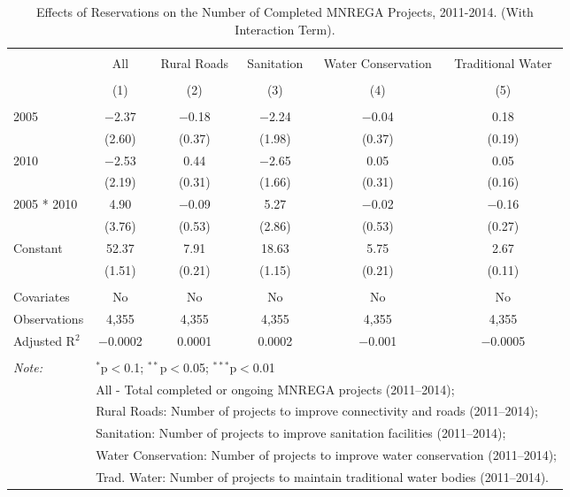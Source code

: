 
\begin{table}[!htbp] \centering 
  \caption{Effects of Reservations on the Number of Completed MNREGA Projects, 2011-2014. (With Interaction Term).} 
  \label{main_mnrega_interaction} 
\scriptsize 
\begin{tabular}{@{\extracolsep{0pt}}lccccc} 
\\[-1.8ex]\hline 
\hline \\[-1.8ex] 
 & All & Rural Roads & Sanitation & Water Conservation & Traditional Water \\ 
\\[-1.8ex] & (1) & (2) & (3) & (4) & (5)\\ 
\hline \\[-1.8ex] 
 2005 & $-$2.37 & $-$0.18 & $-$2.24 & $-$0.04 & 0.18 \\ 
  & (2.60) & (0.37) & (1.98) & (0.37) & (0.19) \\ 
  2010 & $-$2.53 & 0.44 & $-$2.65 & 0.05 & 0.05 \\ 
  & (2.19) & (0.31) & (1.66) & (0.31) & (0.16) \\ 
  2005 * 2010 & 4.90 & $-$0.09 & 5.27 & $-$0.02 & $-$0.16 \\ 
  & (3.76) & (0.53) & (2.86) & (0.53) & (0.27) \\ 
  Constant & 52.37 & 7.91 & 18.63 & 5.75 & 2.67 \\ 
  & (1.51) & (0.21) & (1.15) & (0.21) & (0.11) \\ 
 \hline \\[-1.8ex] 
Covariates & No & No & No & No & No \\ 
Observations & 4,355 & 4,355 & 4,355 & 4,355 & 4,355 \\ 
Adjusted R$^{2}$ & $-$0.0002 & 0.0001 & 0.0002 & $-$0.001 & $-$0.0005 \\ 
\hline 
\hline \\[-1.8ex] 
\textit{Note:}  & \multicolumn{5}{l}{$^{*}$p$<$0.1; $^{**}$p$<$0.05; $^{***}$p$<$0.01} \\ 
 & \multicolumn{5}{l}{All - Total completed or ongoing MNREGA projects (2011--2014);} \\ 
 & \multicolumn{5}{l}{Rural Roads: Number of projects to improve connectivity and roads (2011--2014);} \\ 
 & \multicolumn{5}{l}{Sanitation:  Number of projects to improve sanitation facilities  (2011--2014);} \\ 
 & \multicolumn{5}{l}{Water Conservation: Number of projects to improve water conservation (2011--2014);} \\ 
 & \multicolumn{5}{l}{Trad. Water: Number of projects to maintain traditional water bodies (2011--2014).} \\ 
\end{tabular} 
\end{table} 
